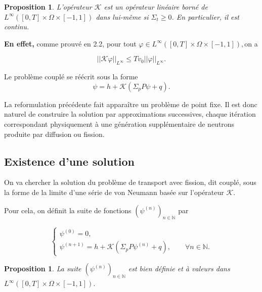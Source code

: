\documentclass{article}
\newtheorem{proposition}[theorem]{Proposition}
\begin{document}
\begin{proposition}
    L’opérateur $\mathcal K$ est un opérateur linéaire borné de \(L^\infty([0,T]\times\Omega\times[-1,1])\) dans lui-même si $\Sigma_t\geq0$. En particulier, il est continu.
\end{proposition}

\textbf{En effet,} comme prouvé en 2.2, pour tout \(\varphi \in L^\infty([0,T]\times\Omega\times[-1,1]),\)on a

\begin{equation}
    ||\mathcal K\varphi||_{L^\infty} \leq Tv_0||\varphi||_{L^\infty}.
\end{equation}

Le problème couplé se réécrit sous la forme
\begin{equation}
    \psi = h + \mathcal K(\Sigma_pP\psi + q).
\end{equation}

La reformulation précédente fait apparaître un problème de point fixe. Il est donc naturel de construire la solution par approximations successives, chaque itération correspondant physiquement à une génération supplémentaire de neutrons produite par diffusion ou fission.

\subsection{Existence d’une solution}

On va chercher la solution du problème de transport avec fission, dit couplé, sous la forme de la limite d’une série de von Neumann basée sur l’opérateur $\mathcal K$. \

Pour cela, on définit la suite de fonctions \(\left(\psi^{(n)}\right)_{n\in\mathbb N}\) par

\begin{equation}
\begin{cases}
    \psi^{(0)} = 0, \\
    \psi^{(n+1)} = h+\mathcal K(\Sigma_pP\psi^{(n)}+q), \qquad
    \forall n\in\mathbb N.
\end{cases}
\end{equation}

\medskip

\begin{proposition}
    La suite \(\left(\psi^{(n)}\right)_{n\in\mathbb N}\) est bien définie et à valeurs dans \(L^\infty([0,T]\times\Omega\times[-1,1]).\)
\end{proposition}
\end{document}
